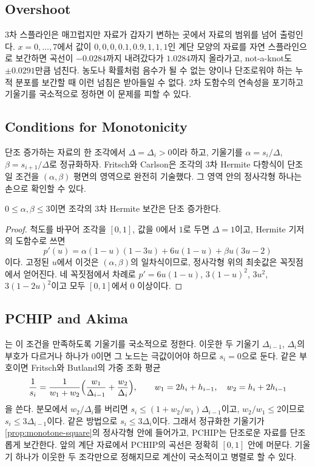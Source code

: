 \subsection{Overshoot}

3차 스플라인은 매끄럽지만 자료가 갑자기 변하는 곳에서 자료의 범위를 넘어 출렁인다. $x=0,\dots,7$에서 값이 $0,0,0,0.1,0.9,1,1,1$인 계단 모양의 자료를 자연 스플라인으로 보간하면 곡선이 $-0.0284$까지 내려갔다가 $1.0284$까지 올라가고, not-a-knot도 $\pm0.0291$만큼 넘친다. 농도나 확률처럼 음수가 될 수 없는 양이나 단조로워야 하는 누적 분포를 보간할 때 이런 넘침은 받아들일 수 없다. 2차 도함수의 연속성을 포기하고 기울기를 국소적으로 정하면 이 문제를 피할 수 있다.

\subsection{Conditions for Monotonicity}

단조 증가하는 자료의 한 조각에서 $\Delta=\Delta_i>0$이라 하고, 기울기를 $\alpha=s_i/\Delta$, $\beta=s_{i+1}/\Delta$로 정규화하자. Fritsch와 Carlson은 조각의 3차 Hermite 다항식이 단조일 조건을 $(\alpha,\beta)$ 평면의 영역으로 완전히 기술했다\cite{fritsch1980}. 그 영역 안의 정사각형 하나는 손으로 확인할 수 있다.

\begin{proposition}
\label{prop:monotone-square}
$0\le\alpha,\beta\le3$이면 조각의 3차 Hermite 보간은 단조 증가한다.
\end{proposition}

\begin{proof}
척도를 바꾸어 조각을 $[0,1]$, 값을 $0$에서 $1$로 두면 $\Delta=1$이고, Hermite 기저의 도함수로 쓰면
\[
p'(u)=\alpha(1-u)(1-3u)+6u(1-u)+\beta u(3u-2)
\]
이다. 고정된 $u$에서 이것은 $(\alpha,\beta)$의 일차식이므로, 정사각형 위의 최솟값은 꼭짓점에서 얻어진다. 네 꼭짓점에서 차례로 $p'=6u(1-u)$, $3(1-u)^2$, $3u^2$, $3(1-2u)^2$이고 모두 $[0,1]$에서 $0$ 이상이다.
\end{proof}

\subsection{PCHIP and Akima}

는 이 조건을 만족하도록 기울기를 국소적으로 정한다. 이웃한 두 기울기 $\Delta_{i-1}$, $\Delta_i$의 부호가 다르거나 하나가 $0$이면 그 노드는 극값이어야 하므로 $s_i=0$으로 둔다. 같은 부호이면 Fritsch와 Butland의 가중 조화 평균
\[
\frac1{s_i}=\frac1{w_1+w_2}\Bigl(\frac{w_1}{\Delta_{i-1}}+\frac{w_2}{\Delta_i}\Bigr),\qquad w_1=2h_i+h_{i-1},\quad w_2=h_i+2h_{i-1}
\]
을 쓴다\cite{fritsch1984}. 분모에서 $w_2/\Delta_i$를 버리면 $s_i\le(1+w_2/w_1)\Delta_{i-1}$이고, $w_2/w_1\le2$이므로 $s_i\le3\Delta_{i-1}$이다. 같은 방법으로 $s_i\le3\Delta_i$이다. 그래서 정규화한 기울기가 \cref{prop:monotone-square}의 정사각형 안에 들어가고, PCHIP는 단조로운 자료를 단조롭게 보간한다. 앞의 계단 자료에서 PCHIP의 곡선은 정확히 $[0,1]$ 안에 머문다. 기울기 하나가 이웃한 두 조각만으로 정해지므로 계산이 국소적이고 병렬로 할 수 있다.

